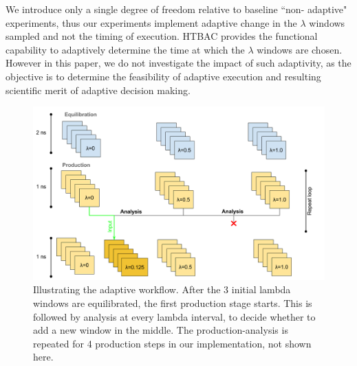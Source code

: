 

We introduce only a single degree of freedom relative to baseline ``non-
adaptive" experiments, thus our experiments implement adaptive change in the
$\lambda$ windows sampled and not the timing of execution. HTBAC provides the 
functional capability to adaptively determine the time at which the $\lambda$ 
windows are chosen. However in this paper, we do not investigate the impact of 
such adaptivity, as the objective is to determine the feasibility of adaptive
execution and resulting scientific merit of adaptive decision making.

\begin{figure}
  \centering
   \includegraphics[width=\columnwidth]{figures/Adaptive_TIES_1.png}
  \caption{Illustrating the adaptive workflow. After the 3 initial lambda 
  windows are equilibrated, the first production stage starts. 
  This is followed by analysis at every lambda interval, to decide whether 
  to add a new window in the middle. The production-analysis is repeated 
  for 4 production steps in our implementation, not shown here.}
\label{fig:adaptive_TIES}
\end{figure}

